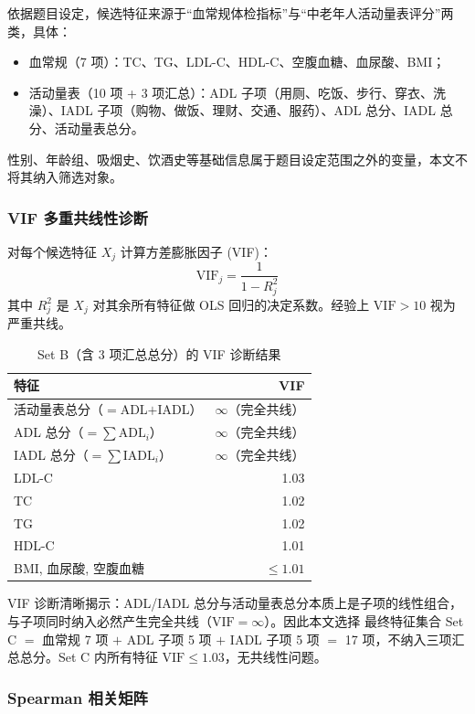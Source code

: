 \documentclass{MathorCupmodeling}
\providecommand{\tightlist}{%
  \setlength{\itemsep}{0pt}\setlength{\parskip}{0pt}}
\begin{document}
依据题目设定，候选特征来源于``血常规体检指标''与``中老年人活动量表评分''两类，具体：

\begin{itemize}
\tightlist
\item 血常规（7 项）：TC、TG、LDL-C、HDL-C、空腹血糖、血尿酸、BMI；
\item 活动量表（10 项 + 3 项汇总）：ADL 子项（用厕、吃饭、步行、穿衣、洗澡）、IADL 子项（购物、做饭、理财、交通、服药）、ADL 总分、IADL 总分、活动量表总分。
\end{itemize}

性别、年龄组、吸烟史、饮酒史等基础信息属于题目设定范围之外的变量，本文不将其纳入筛选对象。

\subsubsection{VIF 多重共线性诊断}

对每个候选特征 $X_j$ 计算方差膨胀因子 (VIF)：
\[
\text{VIF}_j = \frac{1}{1 - R_j^2}
\]
其中 $R_j^2$ 是 $X_j$ 对其余所有特征做 OLS 回归的决定系数。经验上 $\text{VIF} > 10$ 视为严重共线。

\begin{table}[H]
\centering\small
\caption{Set B（含 3 项汇总总分）的 VIF 诊断结果}\label{tab:vif-setB}
\begin{tabular}{@{}l r@{}}
\toprule
特征 & VIF \\
\midrule
活动量表总分（$=$ADL$+$IADL） & $\infty$（完全共线） \\
ADL 总分（$=\sum \text{ADL}_i$） & $\infty$（完全共线） \\
IADL 总分（$=\sum \text{IADL}_i$） & $\infty$（完全共线） \\
LDL-C & 1.03 \\
TC & 1.02 \\
TG & 1.02 \\
HDL-C & 1.01 \\
BMI, 血尿酸, 空腹血糖 & $\le 1.01$ \\
\bottomrule
\end{tabular}
\end{table}

VIF 诊断清晰揭示：ADL/IADL 总分与活动量表总分本质上是子项的线性组合，与子项同时纳入必然产生完全共线（$\text{VIF}=\infty$）。因此本文选择 最终特征集合 Set C $=$ 血常规 7 项 $+$ ADL 子项 5 项 $+$ IADL 子项 5 项 $=$ 17 项，不纳入三项汇总总分。Set C 内所有特征 $\text{VIF} \le 1.03$，无共线性问题。

\subsubsection{Spearman 相关矩阵}
\end{document}
